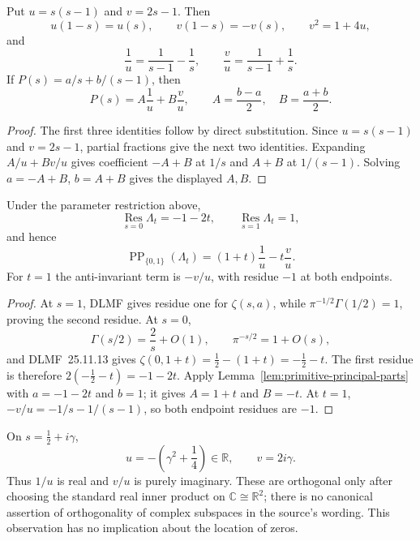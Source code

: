 \begin{lemma}
\label{lem:primitive-principal-parts}
Put $u=s(s-1)$ and $v=2s-1$.  Then
\[
 u(1-s)=u(s),\qquad v(1-s)=-v(s),\qquad v^2=1+4u,
\]
and
\[
 \frac1u=\frac1{s-1}-\frac1s,
 \qquad
 \frac vu=\frac1{s-1}+\frac1s.
\]
If $P(s)=a/s+b/(s-1)$, then
\[
 P(s)=A\frac1u+B\frac vu,\qquad
 A=\frac{b-a}{2},\quad B=\frac{a+b}{2}.
\]
\end{lemma}

\begin{proof}
The first three identities follow by direct substitution.  Since
$u=s(s-1)$ and $v=2s-1$, partial fractions give the next two identities.
Expanding $A/u+Bv/u$ gives coefficient $-A+B$ at $1/s$ and $A+B$ at
$1/(s-1)$.  Solving $a=-A+B$, $b=A+B$ gives the displayed $A,B$.
\end{proof}

\begin{theorem}
\label{thm:primitive-hurwitz-endpoints}
Under the parameter restriction above,
\[
 \operatorname*{Res}_{s=0}\Lambda_t=-1-2t,
 \qquad
 \operatorname*{Res}_{s=1}\Lambda_t=1,
\]
and hence
\[
 \operatorname{PP}_{\{0,1\}}(\Lambda_t)
 =(1+t)\frac1u-t\frac vu.
\]
For $t=1$ the anti-invariant term is $-v/u$, with residue $-1$ at both
endpoints.
\end{theorem}

\begin{proof}
At $s=1$, DLMF gives residue one for $\zeta(s,a)$, while
$\pi^{-1/2}\Gamma(1/2)=1$, proving the second residue.  At $s=0$,
\[
 \Gamma(s/2)=\frac2s+O(1),\qquad \pi^{-s/2}=1+O(s),
 \]
and DLMF~25.11.13 gives
$\zeta(0,1+t)=\tfrac12-(1+t)=-\tfrac12-t$.  The first residue is therefore
$2(-\tfrac12-t)=-1-2t$.  Apply Lemma~\ref{lem:primitive-principal-parts}
with $a=-1-2t$ and $b=1$; it gives $A=1+t$ and $B=-t$.  At $t=1$,
$-v/u=-1/s-1/(s-1)$, so both endpoint residues are $-1$.
\end{proof}

\begin{remark}
On $s=\frac12+i\gamma$,
\[
 u=-\left(\gamma^2+\frac14\right)\in\mathbb R,
 \qquad v=2i\gamma.
\]
Thus $1/u$ is real and $v/u$ is purely imaginary.  These are orthogonal only
after choosing the standard real inner product on
$\mathbb C\cong\mathbb R^2$; there is no canonical assertion of orthogonality
of complex subspaces in the source's wording.  This observation has no
implication about the location of zeros.
\end{remark}


